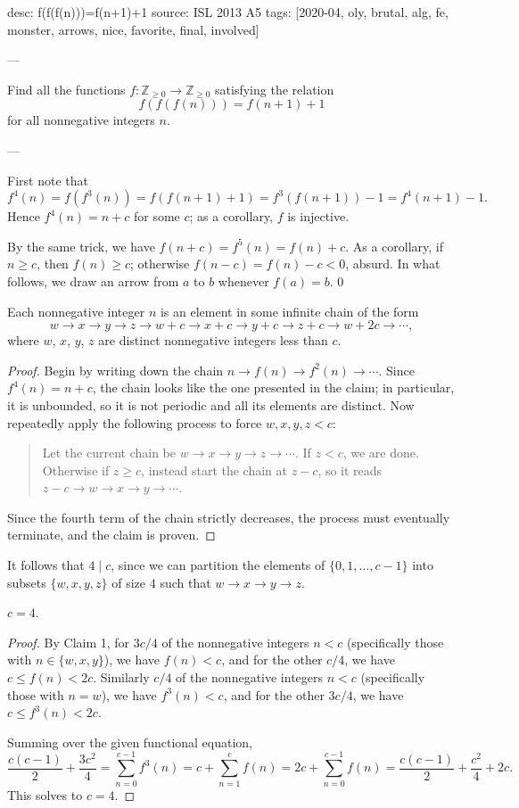 desc: f(f(f(n)))=f(n+1)+1
source: ISL 2013 A5
tags: [2020-04, oly, brutal, alg, fe, monster, arrows, nice, favorite, final, involved]

---

Find all the functions $f:\mathbb Z_{\ge0}\to\mathbb Z_{\ge0}$ satisfying the relation \[f(f(f(n)))=f(n+1)+1\]
for all nonnegative integers $n$.

---

First note that \[f^4(n)=f\left(f^3(n)\right)=f(f(n+1)+1)=f^3(f(n+1))-1=f^4(n+1)-1.\]
Hence $f^4(n)=n+c$ for some $c$; as a corollary, $f$ is injective.

By the same trick, we have $f(n+c)=f^5(n)=f(n)+c$. As a corollary, if $n\ge c$, then $f(n)\ge c$; otherwise $f(n-c)=f(n)-c<0$, absurd. In what follows, we draw an arrow from $a$ to $b$ whenever $f(a)=b$.
\setcounter{claim}0
\begin{claim}
    Each nonnegative integer $n$ is an element in some infinite chain of the form \[w\to x\to y\to z\to w+c\to x+c\to y+c\to z+c\to w+2c\to\cdots,\]
    where $w$, $x$, $y$, $z$ are distinct nonnegative integers less than $c$.
\end{claim}
\begin{proof}
    Begin by writing down the chain $n\to f(n)\to f^2(n)\to\cdots$. Since $f^4(n)=n+c$, the chain looks like the one presented in the claim; in particular, it is unbounded, so it is not periodic and all its elements are distinct. Now repeatedly apply the following process to force $w,x,y,z<c$:
    \begin{quote}
        Let the current chain be $w\to x\to y\to z\to\cdots$. If $z<c$, we are done. Otherwise if $z\ge c$, instead start the chain at $z-c$, so it reads $z-c\to w\to x\to y\to\cdots$.
    \end{quote}
    Since the fourth term of the chain strictly decreases, the process must eventually terminate, and the claim is proven.
\end{proof}

It follows that $4\mid c$, since we can partition the elements of $\{0,1,\ldots,c-1\}$ into subsets $\{w,x,y,z\}$ of size $4$ such that $w\to x\to y\to z$.
\begin{claim}
    $c=4$.
\end{claim}
\begin{proof}
    By Claim 1, for $3c/4$ of the nonnegative integers $n<c$ (specifically those with $n\in\{w,x,y\}$), we have $f(n)<c$, and for the other $c/4$, we have $c\le f(n)<2c$. Similarly $c/4$ of the nonnegative integers $n<c$ (specifically those with $n=w$), we have $f^3(n)<c$, and for the other $3c/4$, we have $c\le f^3(n)<2c$.

    Summing over the given functional equation, \[\frac{c(c-1)}2+\frac{3c^2}4=\sum_{n=0}^{c-1}f^3(n)=c+\sum_{n=1}^cf(n)=2c+\sum_{n=0}^{c-1}f(n)=\frac{c(c-1)}2+\frac{c^2}4+2c.\]
    This solves to $c=4$.
\end{proof}

